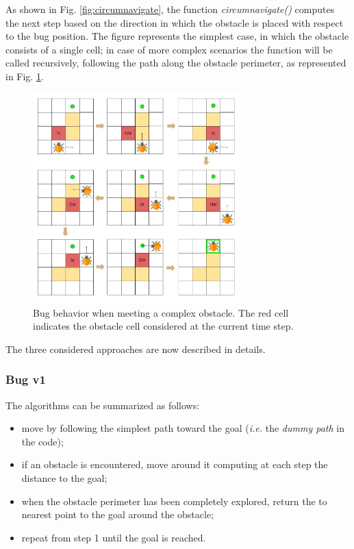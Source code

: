 \documentclass[conference]{IEEEtran}
\begin{document}
As shown in Fig. \ref{fig:circumnavigate}, the function \emph{circumnavigate()} computes the next step based on the direction in which the obstacle is placed with respect to the bug position.
The figure represents the simplest case, in which the obstacle consists of a single cell; in case of more complex scenarios the function will be called recursively, following the path along the obstacle perimeter, as represented in Fig. \ref{fig:bigObs}.
\begin{figure}[]
	\includegraphics[width=8cm]{bigObs.jpg}
	\centering
	\caption{Bug behavior when meeting a complex obstacle. The red cell indicates the obstacle cell considered at the current time step.}
	\label{fig:bigObs}
\end{figure}

The three considered approaches are now described in details.

\subsubsection{Bug v1}
The algorithms can be summarized as follows:
\begin{itemize}
	\item move by following the simplest path toward the goal (\emph{i.e.} the \emph{dummy path} in the code);
	\item if an obstacle is encountered, move around it computing at each step the distance to the goal;
	\item when the obstacle perimeter has been completely explored, return the to nearest point to the goal around the obstacle;
	\item repeat from step 1 until the goal is reached.
\end{itemize}
\end{document}
